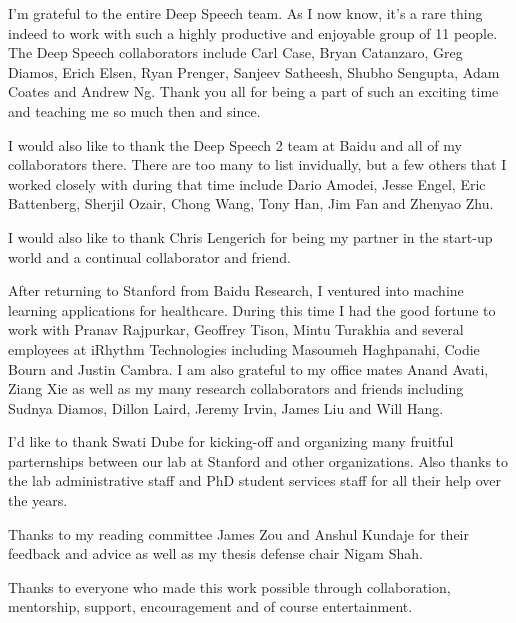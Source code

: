 I'm grateful to the entire Deep Speech team. As I now know, it's a rare thing
indeed to work with such a highly productive and enjoyable group of 11 people.
The Deep Speech collaborators include Carl Case, Bryan Catanzaro, Greg Diamos,
Erich Elsen, Ryan Prenger, Sanjeev Satheesh, Shubho Sengupta, Adam Coates and
Andrew Ng. Thank you all for being a part of such an exciting time and teaching
me so much then and since.

I would also like to thank the Deep Speech 2 team at Baidu and all of my
collaborators there. There are too many to list invidually, but a few others
that I worked closely with during that time include Dario Amodei, Jesse Engel,
Eric Battenberg, Sherjil Ozair, Chong Wang, Tony Han, Jim Fan and Zhenyao Zhu.

I would also like to thank Chris Lengerich for being my partner in the start-up
world and a continual collaborator and friend.

After returning to Stanford from Baidu Research, I ventured into machine
learning applications for healthcare. During this time I had the good fortune
to work with Pranav Rajpurkar, Geoffrey Tison, Mintu Turakhia and several
employees at iRhythm Technologies including Masoumeh Haghpanahi, Codie Bourn
and Justin Cambra. I am also grateful to my office mates Anand Avati, Ziang
Xie as well as my many research collaborators and friends including Sudnya
Diamos, Dillon Laird, Jeremy Irvin, James Liu and Will Hang.

I'd like to thank Swati Dube for kicking-off and organizing many fruitful
parternships between our lab at Stanford and other organizations. Also thanks
to the lab administrative staff and PhD student services staff for all their
help over the years.

Thanks to my reading committee James Zou and Anshul Kundaje for their feedback
and advice as well as my thesis defense chair Nigam Shah.

Thanks to everyone who made this work possible through collaboration,
mentorship, support, encouragement and of course entertainment.

\afterpreface

